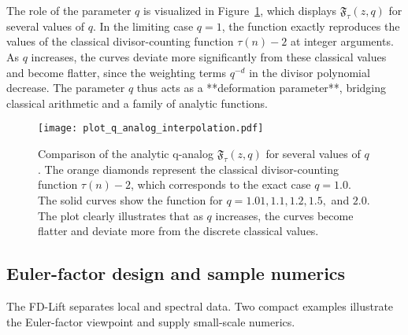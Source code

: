 \documentclass[11pt,a4paper]{amsart}
\theoremstyle{plain}
\theoremstyle{definition}
\theoremstyle{remark}
\begin{document}
The role of the parameter $q$ is visualized in Figure~\ref{fig:q_analog_interpolation}, which displays $\mathfrak{F}_\tau(z,q)$ for several values of $q$. In the limiting case $q=1$, the function exactly reproduces the values of the classical divisor-counting function $\tau(n)-2$ at integer arguments. As $q$ increases, the curves deviate more significantly from these classical values and become flatter, since the weighting terms $q^{-d}$ in the divisor polynomial decrease. The parameter $q$ thus acts as a **deformation parameter**, bridging classical arithmetic and a family of analytic functions.

\begin{figure}[t]
\centering
\texttt{[image: plot\_q\_analog\_interpolation.pdf]}
\caption{Comparison of the analytic q-analog $\mathfrak{F}_\tau(z,q)$ for several values of $q$. The orange diamonds represent the classical divisor-counting function $\tau(n)-2$, which corresponds to the exact case $q=1.0$. The solid curves show the function for $q = 1.01, 1.1, 1.2, 1.5,$ and $2.0$. The plot clearly illustrates that as $q$ increases, the curves become flatter and deviate more from the discrete classical values.}
\label{fig:q_analog_interpolation}
\end{figure}

\FloatBarrier

\subsection{Euler-factor design and sample numerics}
The FD-Lift separates local and spectral data. Two compact examples illustrate the Euler-factor viewpoint and supply small-scale numerics.
\end{document}
